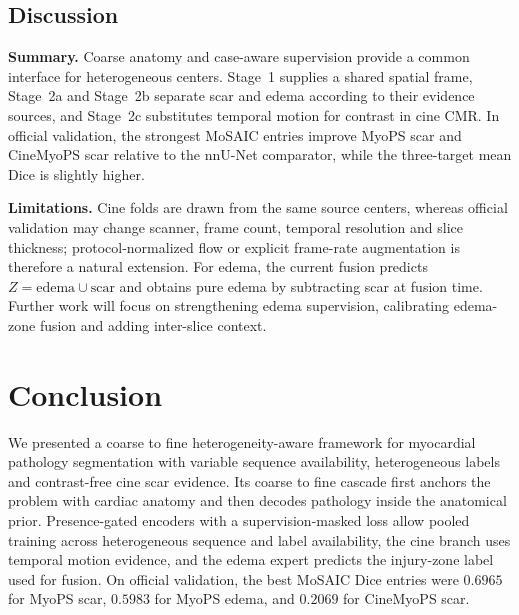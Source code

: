 \documentclass[runningheads]{llncs}
\begin{document}
\FloatBarrier
\subsection{Discussion}

\noindent\textbf{Summary.} Coarse anatomy and case-aware supervision provide a
common interface for heterogeneous centers. Stage~1 supplies a shared spatial
frame, Stage~2a and Stage~2b separate scar and edema according to their evidence
sources, and Stage~2c substitutes temporal motion for contrast in cine CMR. In
official validation, the strongest MoSAIC entries improve MyoPS scar and
CineMyoPS scar relative to the nnU-Net comparator, while the three-target mean
Dice is slightly higher.

\noindent\textbf{Limitations.} Cine folds are drawn from the same source centers,
whereas official validation may change scanner, frame count, temporal resolution
and slice thickness; protocol-normalized flow or explicit frame-rate augmentation
is therefore a natural extension. For edema, the current fusion predicts
$Z=\text{edema}\cup\text{scar}$ and obtains pure edema by subtracting scar at
fusion time. Further work will focus on strengthening edema supervision,
calibrating edema-zone fusion and adding inter-slice context.

\section{Conclusion}

We presented a coarse to fine heterogeneity-aware framework for myocardial
pathology segmentation with variable
sequence availability, heterogeneous labels and contrast-free cine scar evidence.
Its coarse to fine cascade first anchors the problem with cardiac anatomy and
then decodes pathology inside the anatomical prior. Presence-gated encoders with
a supervision-masked loss allow pooled training across heterogeneous sequence and
label availability, the cine branch uses temporal motion evidence, and the edema
expert predicts the injury-zone label used for fusion. On official validation, the best MoSAIC Dice entries were $0.6965$ for MyoPS
scar, $0.5983$ for MyoPS edema, and $0.2069$ for CineMyoPS scar.




\appendix
\end{document}
